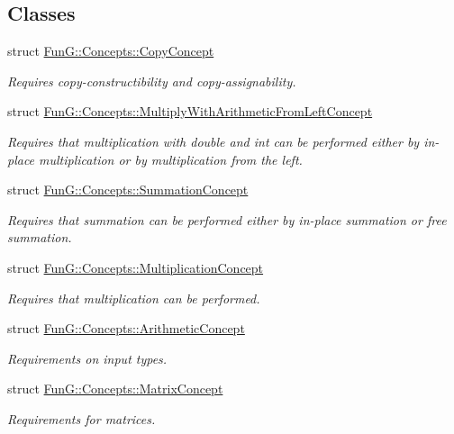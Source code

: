\subsection*{Classes}
\begin{DoxyCompactItemize}
\item 
struct \hyperlink{structFunG_1_1Concepts_1_1CopyConcept}{Fun\-G\-::\-Concepts\-::\-Copy\-Concept}
\begin{DoxyCompactList}\small\item\em Requires copy-\/constructibility and copy-\/assignability. \end{DoxyCompactList}\item 
struct \hyperlink{structFunG_1_1Concepts_1_1MultiplyWithArithmeticFromLeftConcept}{Fun\-G\-::\-Concepts\-::\-Multiply\-With\-Arithmetic\-From\-Left\-Concept}
\begin{DoxyCompactList}\small\item\em Requires that multiplication with double and int can be performed either by in-\/place multiplication or by multiplication from the left. \end{DoxyCompactList}\item 
struct \hyperlink{structFunG_1_1Concepts_1_1SummationConcept}{Fun\-G\-::\-Concepts\-::\-Summation\-Concept}
\begin{DoxyCompactList}\small\item\em Requires that summation can be performed either by in-\/place summation or free summation. \end{DoxyCompactList}\item 
struct \hyperlink{structFunG_1_1Concepts_1_1MultiplicationConcept}{Fun\-G\-::\-Concepts\-::\-Multiplication\-Concept}
\begin{DoxyCompactList}\small\item\em Requires that multiplication can be performed. \end{DoxyCompactList}\item 
struct \hyperlink{structFunG_1_1Concepts_1_1ArithmeticConcept}{Fun\-G\-::\-Concepts\-::\-Arithmetic\-Concept}
\begin{DoxyCompactList}\small\item\em Requirements on input types. \end{DoxyCompactList}\item 
struct \hyperlink{structFunG_1_1Concepts_1_1MatrixConcept}{Fun\-G\-::\-Concepts\-::\-Matrix\-Concept}
\begin{DoxyCompactList}\small\item\em Requirements for matrices. \end{DoxyCompactList}\item 

\end{DoxyCompactItemize}
